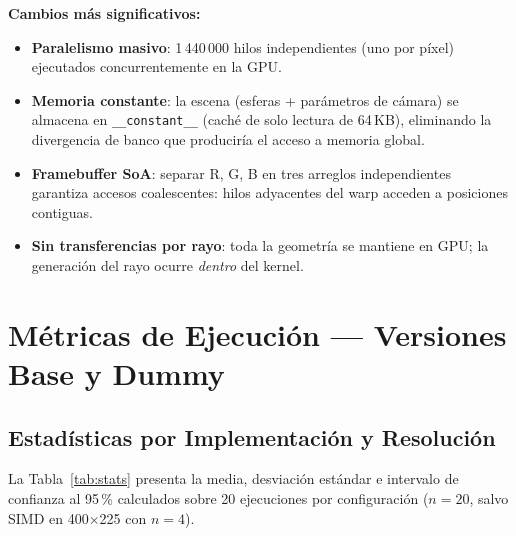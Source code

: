 \documentclass[conference]{IEEEtran}
\begin{document}
\textbf{Cambios más significativos:}
\begin{itemize}
  \item \textbf{Paralelismo masivo}: 1\,440\,000 hilos independientes (uno por píxel)
        ejecutados concurrentemente en la GPU.
  \item \textbf{Memoria constante}: la escena (esferas + parámetros de cámara) se almacena
        en \texttt{\_\_constant\_\_} (caché de solo lectura de 64\,KB), eliminando la
        divergencia de banco que produciría el acceso a memoria global.
  \item \textbf{Framebuffer SoA}: separar R, G, B en tres arreglos independientes garantiza
        accesos coalescentes: hilos adyacentes del warp acceden a posiciones contiguas.
  \item \textbf{Sin transferencias por rayo}: toda la geometría se mantiene en GPU;
        la generación del rayo ocurre \emph{dentro} del kernel.
\end{itemize}

\section{Métricas de Ejecución — Versiones Base y Dummy}

\subsection{Estadísticas por Implementación y Resolución}

La Tabla~\ref{tab:stats} presenta la media, desviación estándar e intervalo de confianza
al 95\,\% calculados sobre 20 ejecuciones por configuración ($n = 20$, salvo SIMD en
400×225 con $n = 4$).
\end{document}
